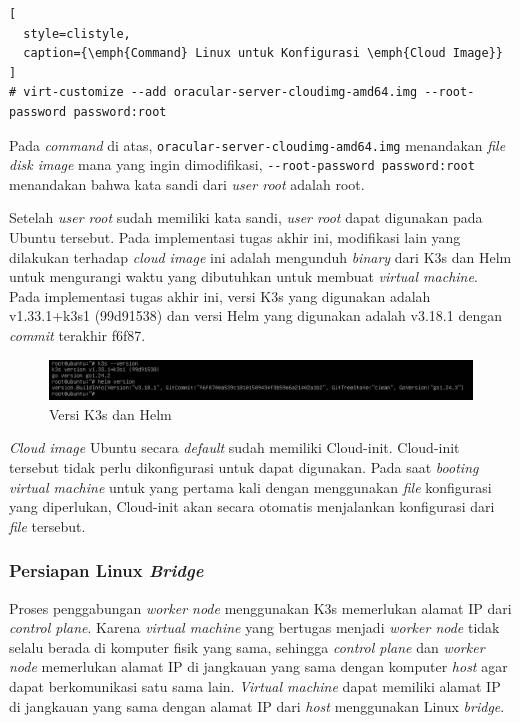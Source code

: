 \begin{lstlisting}[
  style=clistyle,
  caption={\emph{Command} Linux untuk Konfigurasi \emph{Cloud Image}}
]
# virt-customize --add oracular-server-cloudimg-amd64.img --root-password password:root
\end{lstlisting}

Pada \emph{command} di atas, \lstinline{oracular-server-cloudimg-amd64.img} menandakan \emph{file disk image}
mana yang ingin dimodifikasi, \lstinline{--root-password password:root} menandakan bahwa kata sandi
dari \emph{user root} adalah root.

Setelah \emph{user root} sudah memiliki kata sandi, \emph{user root} dapat digunakan
pada Ubuntu tersebut. Pada implementasi tugas akhir ini, modifikasi lain yang dilakukan
terhadap \emph{cloud image} ini adalah mengunduh \emph{binary} dari K3s dan Helm untuk mengurangi
waktu yang dibutuhkan untuk membuat \emph{virtual machine}. Pada implementasi tugas akhir ini,
versi K3s yang digunakan adalah v1.33.1+k3s1 (99d91538) dan versi Helm yang digunakan adalah
v3.18.1 dengan \emph{commit} terakhir f6f87.

\begin{figure}[H]
  \centering
  \includegraphics[scale=0.4]{gambar/k3s-helm-version.png}
  \caption{Versi K3s dan Helm}
  \label{fig:k3s-helm-version}
\end{figure}

\emph{Cloud image} Ubuntu secara \emph{default} sudah memiliki Cloud-init. Cloud-init tersebut
tidak perlu dikonfigurasi untuk dapat digunakan. Pada saat \emph{booting virtual machine} untuk yang
pertama kali dengan menggunakan \emph{file} konfigurasi yang diperlukan, Cloud-init akan secara otomatis
menjalankan konfigurasi dari \emph{file} tersebut.

\subsubsection{Persiapan Linux \emph{Bridge}}
\label{sec:persiapan-linux-bridge}

Proses penggabungan \emph{worker node} menggunakan K3s memerlukan alamat IP
dari \emph{control plane}. Karena \emph{virtual machine} yang bertugas menjadi
\emph{worker node} tidak selalu berada di komputer fisik yang sama, sehingga
\emph{control plane} dan \emph{worker node} memerlukan alamat IP di jangkauan
yang sama dengan komputer \emph{host} agar dapat berkomunikasi satu sama lain.
\emph{Virtual machine} dapat memiliki alamat IP di jangkauan yang sama dengan
alamat IP dari \emph{host} menggunakan Linux \emph{bridge}.

